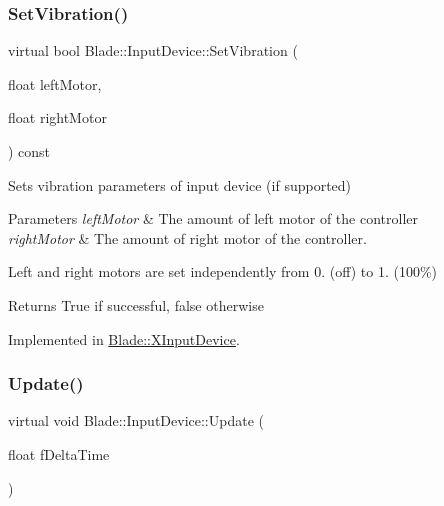 \subsubsection{\texorpdfstring{Set\+Vibration()}{SetVibration()}}
{\footnotesize\ttfamily virtual bool Blade\+::\+Input\+Device\+::\+Set\+Vibration (\begin{DoxyParamCaption}\item[{float}]{left\+Motor,  }\item[{float}]{right\+Motor }\end{DoxyParamCaption}) const\hspace{0.3cm}{\ttfamily [pure virtual]}}



Sets vibration parameters of input device (if supported) 


\begin{DoxyParams}{Parameters}
{\em left\+Motor} & The amount of left motor of the controller \\
\hline
{\em right\+Motor} & The amount of right motor of the controller.\\
\hline
\end{DoxyParams}
Left and right motors are set independently from 0. (off) to 1. (100\%) \begin{DoxyReturn}{Returns}
True if successful, false otherwise 
\end{DoxyReturn}


Implemented in \hyperlink{class_blade_1_1_x_input_device_a9119d7193d51c1003ee6bb8074518ef4}{Blade\+::\+X\+Input\+Device}.

\mbox{\label{class_blade_1_1_input_device_a6c0b653604f7c2a4840116c9e893b3e5}} 
\subsubsection{\texorpdfstring{Update()}{Update()}}
{\footnotesize\ttfamily virtual void Blade\+::\+Input\+Device\+::\+Update (\begin{DoxyParamCaption}\item[{float}]{f\+Delta\+Time }\end{DoxyParamCaption})\hspace{0.3cm}{\ttfamily [pure virtual]}}



